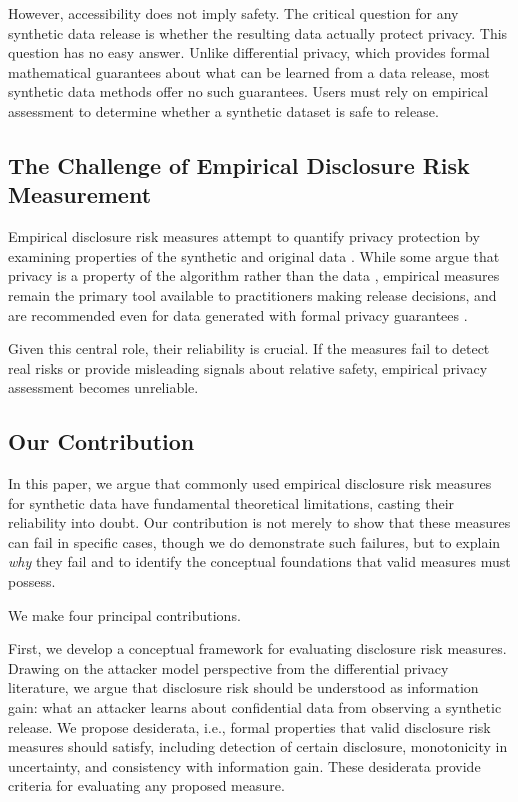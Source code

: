 \documentclass[Afour,sageh,times,doublespace]{sagej}
\begin{document}
However, accessibility does not imply safety. The critical question for any synthetic data release is whether the resulting data actually protect privacy. This question has no easy answer. Unlike differential privacy, which provides formal mathematical guarantees about what can be learned from a data release, most synthetic data methods offer no such guarantees. Users must rely on empirical assessment to determine whether a synthetic dataset is safe to release.

\subsection{The Challenge of Empirical Disclosure Risk Measurement}

Empirical disclosure risk measures attempt to quantify privacy protection by examining properties of the synthetic and original data \citep{Elliot2014, Taub2018, Raab2024a}. While some argue that privacy is a property of the algorithm rather than the data \citep{Jordon2022}, empirical measures remain the primary tool available to practitioners making release decisions, and are recommended even for data generated with formal privacy guarantees \citep{Desfontaines2025}.

Given this central role, their reliability is crucial. If the measures fail to detect real risks or provide misleading signals about relative safety, empirical privacy assessment becomes unreliable.


\subsection{Our Contribution}

In this paper, we argue that commonly used empirical disclosure risk measures for synthetic data have fundamental theoretical limitations, casting their reliability into doubt. Our contribution is not merely to show that these measures can fail in specific cases, though we do demonstrate such failures, but to explain \textit{why} they fail and to identify the conceptual foundations that valid measures must possess.

We make four principal contributions.

First, we develop a conceptual framework for evaluating disclosure risk measures. Drawing on the attacker model perspective from the differential privacy literature, we argue that disclosure risk should be understood as information gain: what an attacker learns about confidential data from observing a synthetic release. We propose desiderata, i.e., formal properties that valid disclosure risk measures should satisfy, including detection of certain disclosure, monotonicity in uncertainty, and consistency with information gain. These desiderata provide criteria for evaluating any proposed measure.
\end{document}
